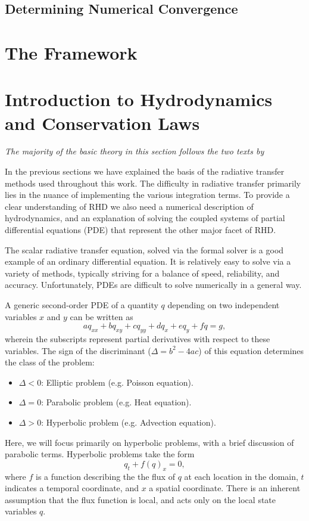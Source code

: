 \subsection{Determining Numerical Convergence}

\section{The \Lw{} Framework}




\section{Introduction to Hydrodynamics and Conservation Laws}
\emph{The majority of the basic theory in this section follows the two texts by \citet{LeVeque1997}}

In the previous sections we have explained the basis of the radiative transfer methods used throughout this work.
The difficulty in radiative transfer primarily lies in the nuance of implementing the various integration terms.
To provide a clear understanding of RHD we also need a numerical description of hydrodynamics, and an explanation of solving the coupled systems of partial differential equations (PDE) that represent the other major facet of RHD.

The scalar radiative transfer equation, solved via the formal solver is a good example of an ordinary differential equation.
It is relatively easy to solve via a variety of methods, typically striving for a balance of speed, reliability, and accuracy.
Unfortunately, PDEs are difficult to solve numerically in a general way.

A generic second-order PDE of a quantity $q$ depending on two independent variables $x$ and $y$ can be written as
\begin{equation}
    aq_{xx} + bq_{xy} + cq_{yy} + dq_x + eq_y + fq = g,
\end{equation}
wherein the subscripts represent partial derivatives with respect to these variables.
The sign of the discriminant ($\Delta = b^2-4ac$) of this equation determines the class of the problem:
\begin{itemize}
    \item $\Delta < 0$: Elliptic problem (e.g. Poisson equation).
    \item $\Delta = 0$: Parabolic problem (e.g. Heat equation).
    \item $\Delta > 0$: Hyperbolic problem (e.g. Advection equation).
\end{itemize}
Here, we will focus primarily on hyperbolic problems, with a brief discussion of parabolic terms.
Hyperbolic problems take the form
\begin{equation}\label{Eq:ConsLaw}
    q_t + f(q)_x = 0,
\end{equation}
where $f$ is a function describing the the flux of $q$ at each location in the domain, $t$ indicates a temporal coordinate, and $x$ a spatial coordinate.
There is an inherent assumption that the flux function is local, and acts only on the local state variables $q$.

